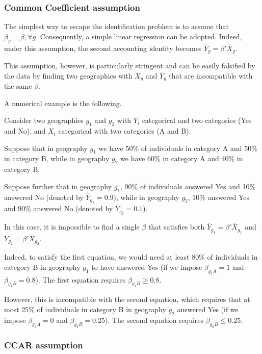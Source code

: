 \subsubsection{Common Coefficient assumption}

The simplest way to escape the identification problem is to assume that $\beta_g = \beta, \forall g$. Consequently, a simple linear regression can be adopted. Indeed, under this assumption, the second accounting identity becomes $\overline{Y}_g = \beta'\overline{X}_g$.

This assumption, however, is particularly stringent and can be easily falsified by the data by finding two geographies with $\overline{X}_g$ and $\overline{Y}_g$ that are incompatible with the same $\beta$.

A numerical example is the following.

Consider two geographies $g_1$ and $g_2$ with $Y_i$ categorical and two categories (Yes and No), and $X_i$ categorical with two categories (A and B).

Suppose that in geography $g_1$ we have 50\% of individuals in category A and 50\% in category B, while in geography $g_2$ we have 60\% in category A and 40\% in category B.

Suppose further that in geography $g_1$, 90\% of individuals answered Yes and 10\% answered No (denoted by $\overline{Y}_{g_1} = 0.9$), while in geography $g_2$, 10\% answered Yes and 90\% answered No (denoted by $\overline{Y}_{g_2} = 0.1$).

In this case, it is impossible to find a single $\beta$ that satisfies both $\overline{Y}_{g_1} = \beta'\overline{X}_{g_1}$ and $\overline{Y}_{g_2} = \beta'\overline{X}_{g_2}$.

Indeed, to satisfy the first equation, we would need at least 80\% of individuals in category B in geography $g_1$ to have answered Yes (if we impose $\beta_{g_1A} = 1$ and $\beta_{g_1B} = 0.8$). The first equation requires $\beta_{g_1B} \geq 0.8$.

However, this is incompatible with the second equation, which requires that at most 25\% of individuals in category B in geography $g_2$ answered Yes (if we impose $\beta_{g_2A} = 0$ and $\beta_{g_2B} = 0.25$). The second equation requires $\beta_{g_2B} \leq 0.25$.

\subsubsection{CCAR assumption}

